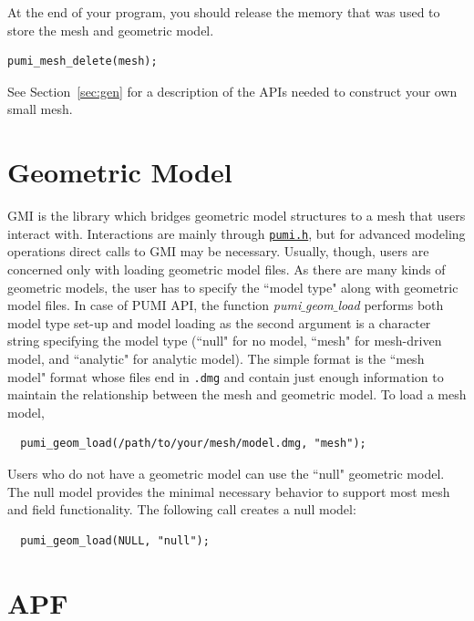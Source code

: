 \documentclass{article}
\begin{document}
At the end of your program, you should release the
memory that was used to store the mesh and geometric model.

\begin{lstlisting}
pumi_mesh_delete(mesh);
\end{lstlisting}

See Section~\ref{sec:gen} for a description of the APIs needed to construct your own small mesh.

\section{Geometric Model}
\label{sec:gmi}

GMI is the library which bridges geometric model structures
to a mesh that users interact with.
Interactions are mainly through
\href{https://github.com/SCOREC/core/blob/master/pumi/pumi.h}{\texttt{pumi.h}},
but for advanced modeling operations direct calls to GMI may be necessary.
Usually, though, users are concerned only with loading geometric model files.
As there are many kinds of geometric models, the user has to specify the
``model type" along with geometric model files.
In case of PUMI API, the function \emph{pumi$\_$geom$\_$load} performs both
model type set-up and model loading as the second argument is a character
string specifying the model type (``null" for no model, ``mesh" for
mesh-driven model, and ``analytic" for analytic model).
The simple format is the ``mesh model" format whose files end in \texttt{.dmg}
and contain just enough information to maintain the relationship between the
mesh and geometric model.
To load a mesh model,

\begin{lstlisting}
  pumi_geom_load(/path/to/your/mesh/model.dmg, "mesh");
\end{lstlisting}

Users who do not have a geometric model can use the ``null" geometric model.
The null model provides the minimal necessary behavior to support
most mesh and field functionality.
The following call creates a null model:

\begin{lstlisting}
  pumi_geom_load(NULL, "null");
\end{lstlisting}

\section{APF}
\end{document}
